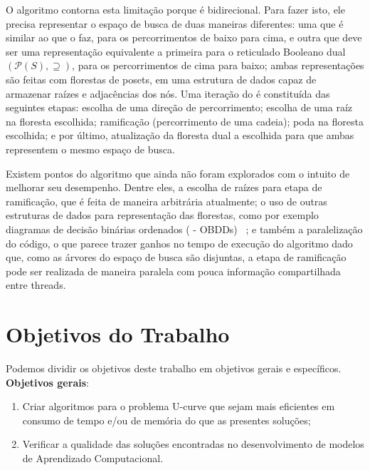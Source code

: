 O algoritmo  contorna esta limitação porque é bidirecional.
Para fazer isto, ele precisa representar o espaço de busca de duas 
maneiras diferentes: uma que é similar ao que o  faz, para
os percorrimentos de baixo para cima, e outra que deve ser uma 
representação equivalente a primeira para o reticulado Booleano dual 
$(\mathcal{P}(S), \supseteq)$, para os percorrimentos de cima para 
baixo; ambas representações são feitas com florestas de posets, em uma
estrutura de dados capaz de armazenar raízes e adjacências dos nós. Uma
iteração do  é constituída das seguintes etapas: escolha de
uma direção de percorrimento; escolha de uma raíz na floresta escolhida;
ramificação (percorrimento de uma cadeia); poda na floresta escolhida; 
e por último, atualização da floresta dual a escolhida para que ambas
representem o mesmo espaço de busca.

Existem pontos do algoritmo  que ainda não foram explorados
com o intuito de melhorar seu desempenho. Dentre eles, a escolha de 
raízes para etapa de ramificação, que é feita de maneira arbitrária 
atualmente; o uso de outras estruturas de dados para representação das 
florestas, como por exemplo diagramas de decisão binárias ordenados 
( - OBDDs) ~\cite{Bry86}; 
e também a paralelização do código, o que parece trazer ganhos no tempo 
de execução do algoritmo dado que, como as árvores do espaço de
busca são disjuntas, a etapa de ramificação pode ser realizada de 
maneira paralela com pouca informação compartilhada entre threads.


\section{Objetivos do Trabalho}
Podemos dividir os objetivos deste trabalho em objetivos gerais e 
específicos.\\

{\bf Objetivos gerais}:
\begin{enumerate}
\item{Criar algoritmos para o problema U-curve que sejam mais eficientes
em consumo de tempo e/ou de memória do que as presentes soluções;}
\item{Verificar a qualidade das soluções encontradas no desenvolvimento
de modelos de Aprendizado Computacional.}
\end{enumerate}

